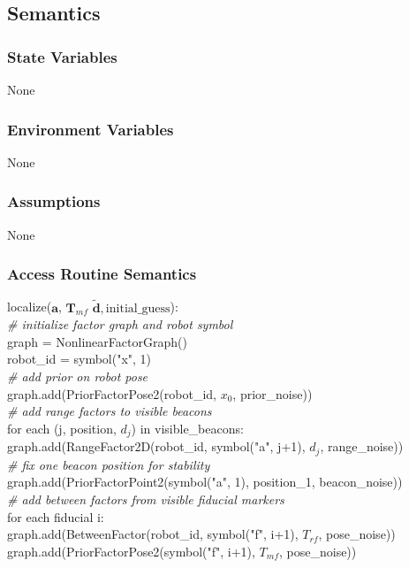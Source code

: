 \documentclass[12pt, titlepage]{article}
\begin{document}
\subsection{Semantics}

\subsubsection{State Variables}
None

\subsubsection{Environment Variables}
None

\subsubsection{Assumptions}
None

\subsubsection{Access Routine Semantics}

\noindent localize($\mathbf{a}$, $\mathbf{T}_{mf}$ $\mathbf{\tilde{d}}, \mathrm{initial\_guess}$):\\

\noindent \textit{\# initialize factor graph and robot symbol}\\
graph = NonlinearFactorGraph()\\
robot\_id = symbol("x", 1)\\

\noindent \textit{\# add prior on robot pose}\\
graph.add(PriorFactorPose2(robot\_id, $x_0$, prior\_noise))\\

\noindent \textit{\# add range factors to visible beacons}\\
for each (j, position, $d_j$) in visible\_beacons:\\
    graph.add(RangeFactor2D(robot\_id, symbol("a", j+1), $d_j$, range\_noise))\\

\noindent \textit{\# fix one beacon position for stability}\\
graph.add(PriorFactorPoint2(symbol("a", 1), position\_1, beacon\_noise))\\

\noindent \textit{\# add between factors from visible fiducial markers}\\
for each fiducial i:\\
    graph.add(BetweenFactor(robot\_id, symbol("f", i+1), $T_{rf}$, pose\_noise))\\
    graph.add(PriorFactorPose2(symbol("f", i+1), $T_{mf}$, pose\_noise))\\
\end{document}

